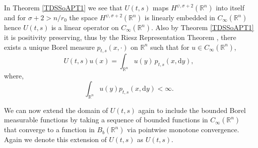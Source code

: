 \documentclass[a4paper, 12pt]{report}
\theoremstyle{remark}
\theoremstyle{definition}
\begin{document}
In Theorem \ref{TDSSoAPT1} we see that $U(t, s)$ maps $H^{\psi, \sigma + 2}(\mathbb{R}^n)$ into itself and for $\sigma + 2 > n/r_0$ the space $H^{\psi, \sigma + 2}(\mathbb{R}^n)$ is linearly embedded in $C_\infty(\mathbb{R}^n)$ hence $U(t, s)$ is a linear operator on $C_\infty(\mathbb{R}^n)$.  Also by Theorem \ref{TDSSoAPT1} it is positivity preserving, thus by the Riesz Representation Theorem \cite[Theorem 2.3.4.C]{Vol1}, there exists a unique Borel measure $p_{t, s}(x, \cdot)$ on $\mathbb{R}^n$ such that for $u \in C_\infty(\mathbb{R}^n)$,
\begin{equation}
U(t, s)u(x) = \int_{\mathbb{R}^n}u(y)\,p_{t, s}(x, \mathrm{d}y),
\end{equation}
where,
\begin{equation}\label{BOoVaI}
\int_{\mathbb{R}^n}u(y)p_{t, s}(x, \mathrm{d}y) < \infty.
\end{equation}

We can now extend the domain of $U(t, s)$ again to include the bounded Borel measurable functions by taking a sequence of bounded functions in $C_\infty(\mathbb{R}^n)$ that converge to a function in $B_b(\mathbb{R}^n)$ via pointwise monotone convergence.  Again we denote this extension of $U(t, s)$ as $U(t, s)$.
\end{document}
